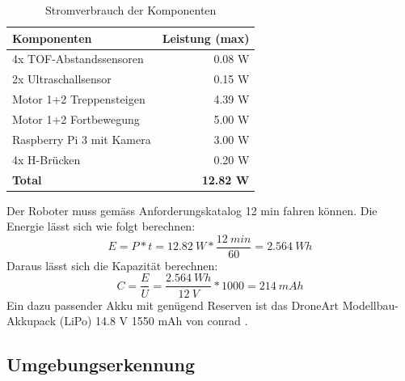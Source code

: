 \begin{table}[H]
\centering
\begin{tabular}{|l|r|}
\hline
\textbf{Komponenten} & \textbf{Leistung (max)} \\ \hline
4x TOF-Abstandssensoren & 0.08 W \\ \hline
2x Ultraschallsensor & 0.15 W \\ \hline
Motor 1+2 Treppensteigen & 4.39 W \\ \hline
Motor 1+2 Fortbewegung & 5.00 W \\ \hline
Raspberry Pi 3 mit Kamera & 3.00 W \\ \hline
4x H-Brücken & 0.20 W \\ \hline
\textbf{Total} & \textbf{12.82 W} \\ \hline
\end{tabular}
\caption{Stromverbrauch der Komponenten}
\label{tab:stromverbrauch-der-komponenten}
\end{table}


Der Roboter muss gemäss Anforderungskatalog 12 min fahren können. Die Energie lässt sich wie folgt berechnen:
\[E = P * t = 12.82\ W * \frac{12\ min}{60} = 2.564\ Wh\]
Daraus lässt sich die Kapazität berechnen:
\[C = \frac{E}{U} = \frac{2.564\ Wh}{12\ V} * 1000 = 214\ mAh\]
Ein dazu passender Akku mit genügend Reserven ist das DroneArt Modellbau-Akkupack (LiPo) 14.8 V 1550 mAh von conrad \cite{Akku}.


\newpage
\subsection{Umgebungserkennung}
